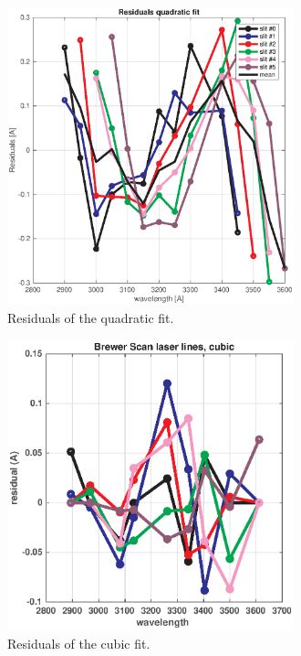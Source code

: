 \documentclass[acp, manuscript]{copernicus}
\begin{document}
\clearpage

\begin{figure}[t]
\includegraphics[width=8.3cm]{figures/General_DSP_QUAD_RES.eps}
\caption{ Residuals of the quadratic fit.}
\label{fig:dsp_residual_quad}
\end{figure}

\clearpage
\begin{figure}[t]
\includegraphics[width=8.3cm]{figures/General_brewer_scan_cubic_residual.eps}
\caption{ Residuals of the cubic fit.}
\label{fig:dsp_residual_cubic}
\end{figure}

\end{document}
